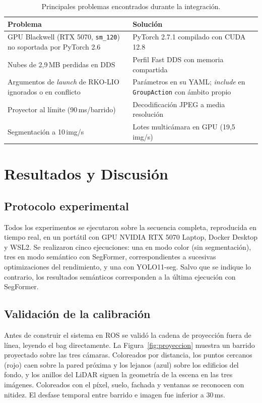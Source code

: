 \documentclass[11pt, twoside]{article}
\begin{document}
\begin{table}[t]
\centering
\small
\setlength{\tabcolsep}{3pt}
\begin{tabular}{@{}p{}p{}@{}}
\toprule
\textbf{Problema} & \textbf{Solución} \\
\midrule
GPU Blackwell (RTX 5070, \texttt{sm\_120}) no soportada por PyTorch 2.6 & PyTorch 2.7.1 compilado con CUDA 12.8 \\
Nubes de 2,9\,MB perdidas en DDS & Perfil Fast DDS con memoria compartida \\
Argumentos de \emph{launch} de RKO-LIO ignorados o en conflicto & Parámetros en su YAML; \emph{include} en \texttt{GroupAction} con ámbito propio \\
Proyector al límite (90\,ms/barrido) & Decodificación JPEG a media resolución \\
Segmentación a 10\,img/s & Lotes multicámara en GPU (19,5\,img/s) \\
\bottomrule
\end{tabular}
\caption{Principales problemas encontrados durante la integración.}
\label{tab:problemas}
\end{table}

\section{Resultados y Discusión}

\subsection{Protocolo experimental}

Todos los experimentos se ejecutaron sobre la secuencia completa, reproducida en tiempo real, en un portátil con GPU NVIDIA RTX 5070 Laptop, Docker Desktop y WSL2. Se realizaron cinco ejecuciones: una en modo color (sin segmentación), tres en modo semántico con SegFormer, correspondientes a sucesivas optimizaciones del rendimiento, y una con YOLO11-seg. Salvo que se indique lo contrario, los resultados semánticos corresponden a la última ejecución con SegFormer.

\subsection{Validación de la calibración}

Antes de construir el sistema en ROS se validó la cadena de proyección fuera de línea, leyendo el bag directamente. La Figura~\ref{fig:proyeccion} muestra un barrido proyectado sobre las tres cámaras. Coloreados por distancia, los puntos cercanos (rojo) caen sobre la pared próxima y los lejanos (azul) sobre los edificios del fondo, y los anillos del LiDAR siguen la geometría de la escena en las tres imágenes. Coloreados con el píxel, suelo, fachada y ventanas se reconocen con nitidez. El desfase temporal entre barrido e imagen fue inferior a 30\,ms.
\end{document}
